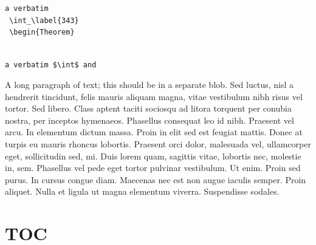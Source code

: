 \documentclass[a4paper,%
twoside]{article}
\newcounter{myCount}
\newtheorem{Theorem}%
[myCount]{Teorema}
\begin{document}
\begin{verbatim}
a verbatim
 \int_\label{343}
 \begin{Theorem}


\end{verbatim}

\verb=a verbatim $\int$ and  =

%

%



A long paragraph of text; this should be in a separate blob.  Sed
luctus, nisl a hendrerit tincidunt, felis mauris aliquam magna, vitae
vestibulum nibh risus vel tortor. Sed libero. Class aptent taciti
sociosqu ad litora torquent per conubia nostra, per inceptos
hymenaeos. Phasellus consequat leo id nibh. Praesent vel arcu. In
elementum dictum massa. Proin in elit sed est feugiat mattis. Donec at
turpis eu mauris rhoncus lobortis. Praesent orci dolor, malesuada vel,
ullamcorper eget, sollicitudin sed, mi. Duis lorem quam, sagittis
vitae, lobortis nec, molestie in, sem. Phasellus vel pede eget tortor
pulvinar vestibulum. Ut enim. Proin sed purus. In cursus congue
diam. Maecenas nec est non augue iaculis semper. Proin aliquet. Nulla
et ligula ut magna elementum viverra. Suspendisse sodales.



\section*{TOC}

\tableofcontents



\end{document}
